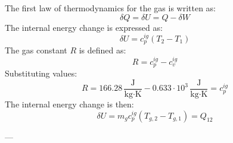 The first law of thermodynamics for the gas is written as:  
\[
\delta Q = \delta U = Q - \delta W
\]  
The internal energy change is expressed as:  
\[
\delta U = c_p^{ig} (T_2 - T_1)
\]  
The gas constant \( R \) is defined as:  
\[
R = c_p^{ig} - c_v^{ig}
\]  
Substituting values:  
\[
R = 166.28 \, \frac{\text{J}}{\text{kg·K}} - 0.633 \cdot 10^3 \, \frac{\text{J}}{\text{kg·K}} = c_p^{ig}
\]  
The internal energy change is then:  
\[
\delta U = m_g c_p^{ig} (T_{g,2} - T_{g,1}) = Q_{12}
\]  

---